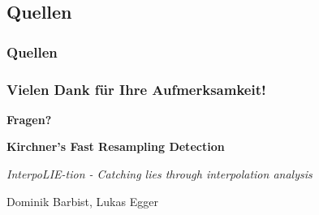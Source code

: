 \documentclass[11pt,t,usepdftitle=false,aspectratio=169]{beamer}
\begin{document}
\subsection{Quellen}
\begin{frame}
    \frametitle{Quellen}
    \begingroup
    \setlength{\bibitemsep}{2pt}
    \setlength{\itemsep}{0pt}
    \setlength{\parskip}{0pt}
    \renewcommand{\bibfont}{\tiny}
    \printbibliography[heading=none]
    \endgroup
\end{frame}

\begin{frame}
	\frametitle{Vielen Dank für Ihre Aufmerksamkeit!}
	
	\vspace{2em}
	
	\begin{center}
		\Large{\textbf{Fragen?}}
		
		\vspace{1.5em}
		
		\textbf{Kirchner's Fast Resampling Detection}
		
		\textit{InterpoLIE-tion - Catching lies through interpolation analysis}
		
		\vspace{1.5em}
		
		\small{Dominik Barbist, Lukas Egger}
	\end{center}
\end{frame}
\end{document}
